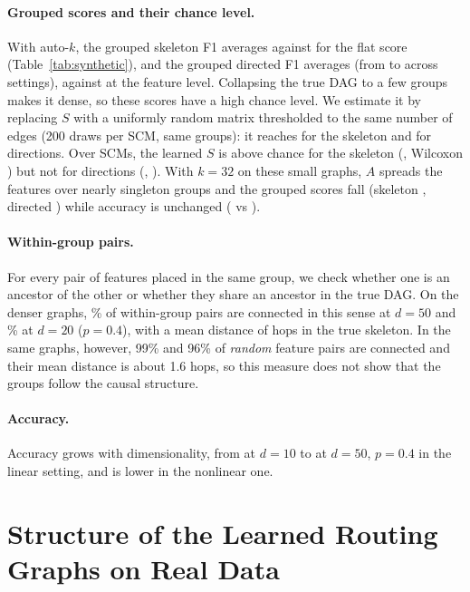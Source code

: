 \documentclass[anon,12pt]{clear2027} %
\begin{document}
\paragraph{Grouped scores and their chance level.}
With auto-$k$, the grouped skeleton F1 averages \SynAutoSkelGrp{} against \SynAutoSkelFlat{} for the flat score (Table~\ref{tab:synthetic}), and the grouped directed F1 averages \SynAutoDirGrp{} (from \SynAutoDirGrpMin{} to \SynAutoDirGrpMax{} across settings), against \SynAutoDirFlat{} at the feature level. Collapsing the true DAG to a few groups makes it dense, so these scores have a high chance level. We estimate it by replacing $S$ with a uniformly random matrix thresholded to the same number of edges (200 draws per SCM, same groups): it reaches \SynRandSkelGrp{} for the skeleton and \SynRandDirGrp{} for directions. Over \SynRandN{} SCMs, the learned $S$ is above chance for the skeleton (\SynLearnSkelGrpB{}, Wilcoxon \SynRandSkelPe{}) but not for directions (\SynLearnDirGrpB{}, \SynRandDirPe{}). With $k=32$ on these small graphs, $A$ spreads the features over nearly singleton groups and the grouped scores fall (skeleton \SynKTTSkelGrp{}, directed \SynKTTDirGrp{}) while accuracy is unchanged (\SynKTTAcc{} vs \SynAutoAcc{}).

\paragraph{Within-group pairs.}
For every pair of features placed in the same group, we check whether one is an ancestor of the other or whether they share an ancestor in the true DAG. On the denser graphs, \SynConnDfiftyPfour{}\% of within-group pairs are connected in this sense at $d=50$ and \SynConnDtwentyPfour{}\% at $d=20$ ($p=0.4$), with a mean distance of \SynDistMean{} hops in the true skeleton. In the same graphs, however, 99\% and 96\% of \emph{random} feature pairs are connected and their mean distance is about 1.6 hops, so this measure does not show that the groups follow the causal structure.

\paragraph{Accuracy.}
Accuracy grows with dimensionality, from \SynAccLinDten{} at $d=10$ to \SynAccLinDfiftyPfour{} at $d=50$, $p=0.4$ in the linear setting, and is lower in the nonlinear one.

\section{Structure of the Learned Routing Graphs on Real Data}
\label{sec:realdags}
\end{document}
